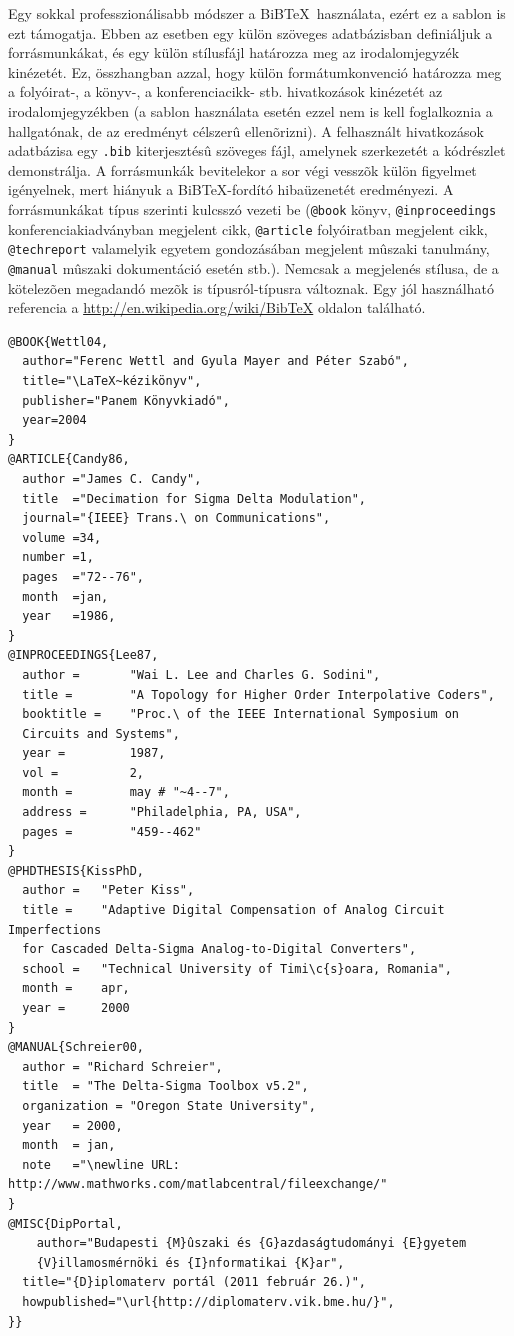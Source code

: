 Egy sokkal professzionálisabb módszer a BiB\TeX~használata, ezért ez a sablon is ezt támogatja. Ebben az esetben egy külön szöveges adatbázisban definiáljuk a forrásmunkákat, és egy külön stílusfájl határozza meg az irodalomjegyzék kinézetét. Ez, összhangban azzal, hogy külön formátumkonvenció határozza meg a folyóirat-, a könyv-, a konferenciacikk- stb. hivatkozások kinézetét az irodalomjegyzékben (a sablon használata esetén ezzel nem is kell foglalkoznia a hallgatónak, de az eredményt célszerû ellenõrizni). A felhasznált hivatkozások adatbázisa egy \verb+.bib+ kiterjesztésû szöveges fájl, amelynek szerkezetét a  kódrészlet demonstrálja. A forrásmunkák bevitelekor a sor végi vesszõk külön figyelmet igényelnek, mert hiányuk a BiB\TeX-fordító hibaüzenetét eredményezi. A forrásmunkákat típus szerinti kulcsszó vezeti be (\verb+@book+ könyv, \verb+@inproceedings+ konferenciakiadványban megjelent cikk, \verb+@article+ folyóiratban megjelent cikk, \verb+@techreport+ valamelyik egyetem gondozásában megjelent mûszaki tanulmány, \verb+@manual+ mûszaki dokumentáció esetén stb.). Nemcsak a megjelenés stílusa, de a kötelezõen megadandó mezõk is típusról-típusra változnak. Egy jól használható referencia a \url{http://en.wikipedia.org/wiki/BibTeX} oldalon található.
\begin{lstlisting}[frame=single,float=!ht,caption=Példa szöveges irodalomjegyzék-adatbázisra BiBTeX használata esetén., label=listing:Bibtex]
@BOOK{Wettl04,
  author="Ferenc Wettl and Gyula Mayer and Péter Szabó",
  title="\LaTeX~kézikönyv",
  publisher="Panem Könyvkiadó",
  year=2004
}
@ARTICLE{Candy86,
  author ="James C. Candy",
  title  ="Decimation for Sigma Delta Modulation",
  journal="{IEEE} Trans.\ on Communications",
  volume =34,
  number =1,
  pages  ="72--76",
  month  =jan,
  year   =1986,
}
@INPROCEEDINGS{Lee87,
  author =       "Wai L. Lee and Charles G. Sodini",
  title =        "A Topology for Higher Order Interpolative Coders",
  booktitle =    "Proc.\ of the IEEE International Symposium on 
  Circuits and Systems",
  year =         1987,
  vol =          2,
  month =        may # "~4--7",
  address =      "Philadelphia, PA, USA",
  pages =        "459--462"
}
@PHDTHESIS{KissPhD,
  author =   "Peter Kiss",
  title =    "Adaptive Digital Compensation of Analog Circuit Imperfections 
  for Cascaded Delta-Sigma Analog-to-Digital Converters",
  school =   "Technical University of Timi\c{s}oara, Romania",
  month =    apr,
  year =     2000
}
@MANUAL{Schreier00,
  author = "Richard Schreier",
  title  = "The Delta-Sigma Toolbox v5.2",
  organization = "Oregon State University",
  year   = 2000,
  month  = jan,
  note   ="\newline URL: http://www.mathworks.com/matlabcentral/fileexchange/"
}
@MISC{DipPortal,
	author="Budapesti {M}ûszaki és {G}azdaságtudományi {E}gyetem 
	{V}illamosmérnöki és {I}nformatikai {K}ar",
  title="{D}iplomaterv portál (2011 február 26.)",
  howpublished="\url{http://diplomaterv.vik.bme.hu/}",
}}
\end{lstlisting}

